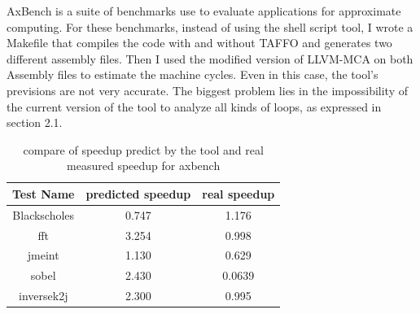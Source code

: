 AxBench is a suite of benchmarks use to evaluate applications for approximate computing.
For these benchmarks, instead of using the shell script tool, I wrote a Makefile that compiles the code with and without TAFFO and generates two different assembly files.
Then I used the modified version of LLVM-MCA on both Assembly files to estimate the machine cycles.
Even in this case, the tool's previsions are not very accurate.
The biggest problem lies in the impossibility of the current version of the tool to analyze all kinds of loops, as expressed in section 2.1.

\begin{table}[ht]
\begin{center}
\caption{compare of speedup predict by the tool and real measured speedup for axbench}
\vspace{0.5cm}
\begin{tabular}{ |c|c|c| } 
 \hline
Test Name & predicted speedup & real speedup \\
 \hline
  Blackscholes & 0.747 & 1.176 \\
 \hline
  fft & 3.254 & 0.998 \\
 \hline
  jmeint & 1.130 & 0.629\\
 \hline
  sobel & 2.430 & 0.0639 \\
 \hline
  inversek2j & 2.300 & 0.995 \\
 \hline
 \end{tabular}
\end{center}
\end{table}

\newpage

